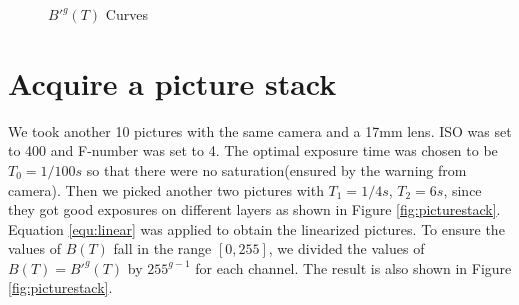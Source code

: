 \documentclass[10pt,twocolumn,letterpaper]{article}
\begin{document}
\begin{figure}[t]

\caption{$B'^g(T)$ Curves}
\label{fig:samplecurves}
\end{figure}

\section{Acquire a picture stack}
\label{sec:stack}

We took another 10 pictures with the same camera and a 17mm lens. ISO was set to 400 and F-number was set to 4. The optimal exposure time was chosen to be $T_0 = 1/100s$ so that there were no saturation(ensured by the warning from camera). Then we picked another two pictures with $T_1 = 1/4s$, $T_2 = 6s$, since they got good exposures on different layers as shown in Figure \ref{fig:picturestack}. \\

Equation \ref{equ:linear} was applied to obtain the linearized pictures. To ensure the values of $B(T)$ fall in the range $[0,255]$, we divided the values of $B(T) = B'^g(T)$ by $255^{g-1}$ for each channel. The result is also shown in Figure \ref{fig:picturestack}.
\end{document}
